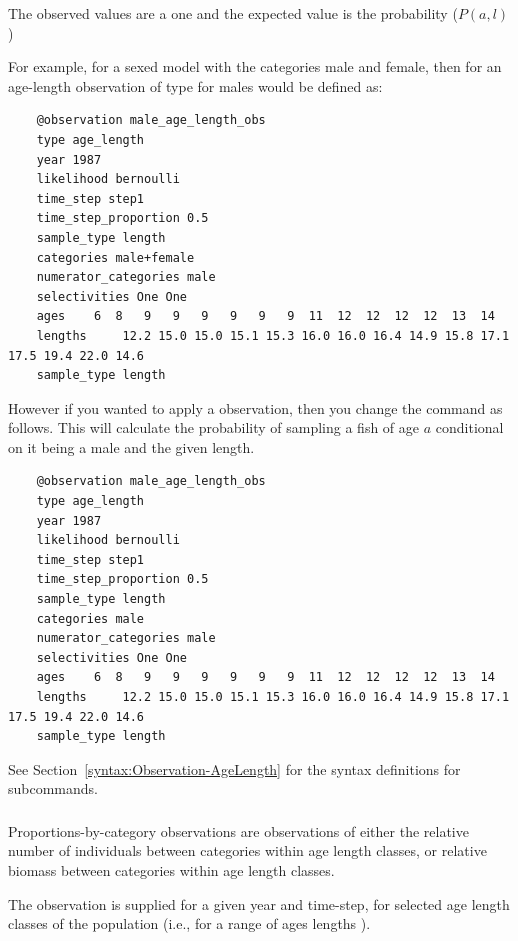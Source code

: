 The observed values are a one and the expected value is the probability (\(P(a,l)\))

For example, for a sexed model with the categories male and female, then for an age-length observation of type  for males would be defined as:
{\small{\begin{verbatim}
	@observation male_age_length_obs
	type age_length
	year 1987
	likelihood bernoulli
	time_step step1
	time_step_proportion 0.5
	sample_type length
	categories male+female
	numerator_categories male
	selectivities One One
	ages   	6  8   9   9   9   9   9   9  11  12  12  12  12  13  14  
	lengths 	12.2 15.0 15.0 15.1 15.3 16.0 16.0 16.4 14.9 15.8 17.1 17.5 19.4 22.0 14.6 
	sample_type length
\end{verbatim}}}

However if you wanted to apply a  observation, then you change the  command as follows. This will calculate the probability of sampling a fish of age \(a\) conditional on it being a male and the given length.

{\small{\begin{verbatim}
	@observation male_age_length_obs
	type age_length
	year 1987
	likelihood bernoulli
	time_step step1
	time_step_proportion 0.5
	sample_type length
	categories male
	numerator_categories male
	selectivities One One
	ages   	6  8   9   9   9   9   9   9  11  12  12  12  12  13  14  
	lengths 	12.2 15.0 15.0 15.1 15.3 16.0 16.0 16.4 14.9 15.8 17.1 17.5 19.4 22.0 14.6 
	sample_type length
\end{verbatim}}}

See Section~\ref{syntax:Observation-AgeLength} for the syntax definitions for  subcommands.
\fi

\subsubsection{}\label{sec:Observation-ProportionsByCategory}

Proportions-by-category observations are observations of either the relative number of individuals between categories within \ifAgeBased age \else length \fi classes, or relative biomass between categories within \ifAgeBased age \else length \fi classes.

The observation is supplied for a given year and time-step, for selected \ifAgeBased age \else length \fi classes of the population (i.e., for a range of \ifAgeBased ages \else lengths \fi).

